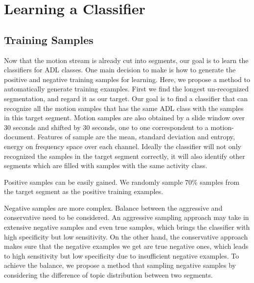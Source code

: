 \documentclass{sigchi}
\begin{document}
\section{Learning a Classifier}
\label{sec.learn-a-classifier}

    \subsection{Training Samples}
    Now that the motion stream is already cut into segments, our goal is to learn the classifiers for ADL classes.
    One main decision to make is how to generate the positive and negative training samples for learning.
    Here, we propose a method to automatically generate training examples.
    First we find the longest un-recognized segmentation, and regard it as our target.
    Our goal is to find a classifier that can recognize all the motion samples that has the same ADL class with the samples in this target segment.
    Motion samples are also obtained by a slide window over 30 seconds and shifted by 30 seconds, one to one correspondent to a motion-document.
    Features of sample are the mean, standard deviation and entropy, energy on frequency space \cite{rai2012mining} over each channel.
    Ideally the classifier will not only recognized the samples in the target segment correctly,
    it will also identify other segments which are filled with samples with the same activity class.

    Positive samples can be easily gained.
    We randomly sample 70\% samples from the target segment as the positive training examples.

    Negative samples are more complex.
    Balance between the aggressive and conservative need to be considered.
    An aggressive sampling approach may take in extensive negative samples and even true samples, which brings the classifier with high specificity but low sensitivity.
    On the other hand, the conservative approach makes sure that the negative examples we get are true negative ones, which leads to high sensitivity but low specificity due to insufficient negative examples.
    To achieve the balance, we propose a method that sampling negative samples by considering the difference of topic distribution between two segments.
\end{document}
